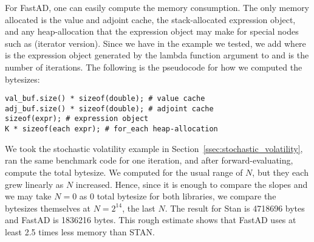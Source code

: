 For FastAD, one can easily compute the memory consumption.
The only memory allocated is the value and adjoint cache,
the stack-allocated expression object,
and any heap-allocation that the expression object may make for special nodes
such as  (iterator version).
Since we have  in the example we tested, 
we add  where 
is the expression object generated by the lambda function argument to 
and  is the number of iterations.
The following is the pseudocode for how we computed the bytesizes:
\begin{lstlisting}[style=customcpp]
val_buf.size() * sizeof(double); # value cache
adj_buf.size() * sizeof(double); # adjoint cache
sizeof(expr); # expression object
K * sizeof(each expr); # for_each heap-allocation
\end{lstlisting} 

We took the stochastic volatility example in Section~\ref{ssec:stochastic_volatility},
ran the same benchmark code for one iteration,
and after forward-evaluating, compute the total bytesize.
We computed for the usual range of $N$, but they each grew linearly as $N$ increased.
Hence, since it is enough to compare the slopes and 
we may take $N=0$ as $ 0$ total bytesize for both libraries,
we compare the bytesizes themselves at $N=2^{14}$, the last $N$.
The result for Stan is 4718696 bytes and FastAD is 1836216 bytes.
This rough estimate shows that FastAD uses at least 2.5 times less memory than STAN.
